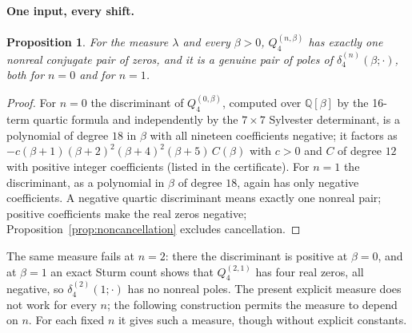 \documentclass[11pt,a4paper]{article}
\newtheorem{proposition}[theorem]{Proposition}
\theoremstyle{definition}
\theoremstyle{remark}
\begin{document}
\paragraph{One input, every shift.}
\begin{proposition}\label{prop:allshift}
For the measure $\lambda$ and every $\beta>0$, $Q_4^{(n,\beta)}$ has exactly
one nonreal conjugate pair of zeros, and it is a genuine pair of poles of
$\delta_4^{(n)}(\beta;\cdot)$, both for $n=0$ and for $n=1$.
\end{proposition}
\begin{proof}
For $n=0$ the discriminant of $Q_4^{(0,\beta)}$, computed over $\mathbb Q[\beta]$
by the 16-term quartic formula and independently by the $7\times7$
Sylvester determinant, is a polynomial of degree $18$ in $\beta$ with all
nineteen coefficients negative; it factors as
$-c(\beta+1)(\beta+2)^2(\beta+4)^2(\beta+5)\,C(\beta)$ with $c>0$ and
$C$ of degree $12$ with positive integer coefficients (listed in the
certificate). For $n=1$ the discriminant, as a polynomial in $\beta$ of
degree $18$, again has only negative coefficients. A negative quartic
discriminant means exactly one nonreal pair; positive coefficients make the
real zeros negative; Proposition~\ref{prop:noncancellation} excludes
cancellation.
\end{proof}
The same measure fails at $n=2$: there the discriminant is positive at
$\beta=0$, and at $\beta=1$ an exact Sturm count shows that
$Q_4^{(2,1)}$ has four real zeros, all negative, so
$\delta_4^{(2)}(1;\cdot)$ has no nonreal poles. The present explicit
measure does not work for every $n$; the following construction permits
the measure to depend on $n$. For each fixed $n$ it gives such a measure,
though without explicit constants.
\end{document}

